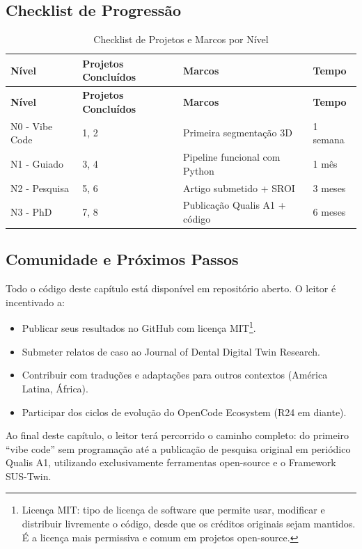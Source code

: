 \subsection{Checklist de Progressão}

\begin{longtable}[c]{p{3cm}p{4cm}p{4.5cm}p{3cm}}
\caption{Checklist de Projetos e Marcos por Nível} \\
\toprule
\textbf{Nível} & \textbf{Projetos Concluídos} & \textbf{Marcos} & \textbf{Tempo} \\
\midrule
\endfirsthead
\toprule
\textbf{Nível} & \textbf{Projetos Concluídos} & \textbf{Marcos} & \textbf{Tempo} \\
\midrule
\endhead
\bottomrule
\endfoot
N0 - Vibe Code & 1, 2 & Primeira segmentação 3D & 1 semana \\
N1 - Guiado & 3, 4 & Pipeline funcional com Python & 1 mês \\
N2 - Pesquisa & 5, 6 & Artigo submetido + SROI & 3 meses \\
N3 - PhD & 7, 8 & Publicação Qualis A1 + código & 6 meses \\
\bottomrule
\end{longtable}

\subsection{Comunidade e Próximos Passos}

Todo o código deste capítulo está disponível em repositório aberto. O leitor é incentivado a:
\begin{itemize}
    \item Publicar seus resultados no GitHub com licença MIT\protect\footnote{Licença MIT: tipo de licença de software que permite usar, modificar e distribuir livremente o código, desde que os créditos originais sejam mantidos. É a licença mais permissiva e comum em projetos open-source.}.
    \item Submeter relatos de caso ao Journal of Dental Digital Twin Research.
    \item Contribuir com traduções e adaptações para outros contextos (América Latina, África).
    \item Participar dos ciclos de evolução do OpenCode Ecosystem (R24 em diante).
\end{itemize}

Ao final deste capítulo, o leitor terá percorrido o caminho completo: do primeiro ``vibe code'' sem programação até a publicação de pesquisa original em periódico Qualis A1, utilizando exclusivamente ferramentas open-source e o Framework SUS-Twin.
